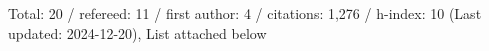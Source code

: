Total: 20 / refereed: 11 / first author: 4 / citations: 1,276 / h-index: 10 (Last updated: 2024-12-20), List attached below